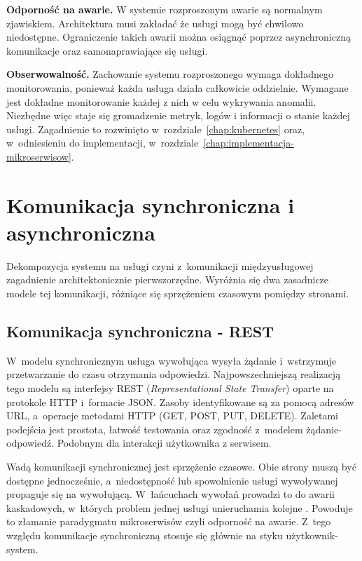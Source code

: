 \textbf{Odporność na awarie.} W systemie rozproszonym awarie są normalnym zjawiskiem. Architektura musi zakładać że usługi 
mogą być chwilowo niedostępne. Ograniczenie takich awarii można osiągnąć poprzez asynchroniczną komunikacje oraz samonaprawiające się usługi.

\textbf{Obserwowalność.} Zachowanie systemu rozproszonego wymaga dokładnego monitorowania, ponieważ każda usługa działa całkowicie oddzielnie.
Wymagane jest dokładne monitorowanie każdej z nich w celu wykrywania anomalii. Niezbędne więc staje się gromadzenie metryk,
logów i informacji o stanie każdej usługi. Zagadnienie to rozwinięto w~rozdziale~\ref{chap:kubernetes}
oraz, w~odniesieniu do implementacji, w~rozdziale~\ref{chap:implementacja-mikroserwisow}.

\section{Komunikacja synchroniczna i asynchroniczna}
\label{sec:komunikacja-synchroniczna-asynchroniczna}

Dekompozycja systemu na usługi czyni z~komunikacji międzyusługowej zagadnienie architektonicznie pierwszorzędne.
Wyróżnia się dwa zasadnicze modele tej komunikacji, różniące się sprzężeniem czasowym pomiędzy stronami.

\subsection{Komunikacja synchroniczna - REST}
\label{subsec:komunikacja-synchroniczna}

W~modelu synchronicznym usługa wywołująca wysyła żądanie i~wstrzymuje przetwarzanie do czasu otrzymania odpowiedzi.
Najpowszechniejszą realizacją tego modelu są interfejsy REST (\emph{Representational State Transfer}) oparte na
protokole HTTP i~formacie JSON. Zasoby identyfikowane są za pomocą adresów URL, a~operacje metodami HTTP (GET, POST, PUT, DELETE).
Zaletami podejścia jest prostota, łatwość testowania oraz zgodność z~modelem żądanie-odpowiedź.
Podobnym dla interakcji użytkownika z serwisem.

Wadą komunikacji synchronicznej jest sprzężenie czasowe. Obie strony muszą być dostępne jednocześnie, a~niedostępność
lub spowolnienie usługi wywoływanej propaguje się na wywołującą. W~łańcuchach wywołań prowadzi to do awarii
kaskadowych, w~których problem jednej usługi unieruchamia kolejne \parencite{richardson2018}. Powoduje to złamanie paradygmatu
mikroserwisów czyli odporność na awarie. Z~tego względu komunikacje synchroniczną stosuje się głównie na styku użytkownik-system.

